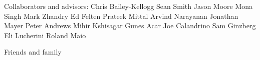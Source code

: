 Collaborators and advisors:
Chris Bailey-Kellogg
Sean Smith
Jason Moore
Mona Singh
Mark Zhandry
Ed Felten
Prateek Mittal
Arvind Narayanan
Jonathan Mayer
Peter Andrews
Mihir Kshisagar
Gunes Acar
Joe Calandrino
Sam Ginzberg
Eli Lucherini
Roland Maio

Friends and family